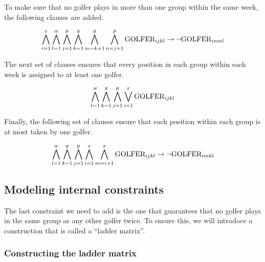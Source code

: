 \documentclass[a4paper]{scrartcl}
\begin{document}
To make sure that no golfer plays in more than one group within the same week, the following clauses are added:

\begin{equation}
\centering
    \bigwedge \limits_{i=1}^x 
    \bigwedge \limits_{l=1}^w 
    \bigwedge \limits_{j=1}^p
    \bigwedge \limits_{k=1}^g 
    \bigwedge \limits_{m=k+1}^g 
    \bigwedge \limits_{n=j+1}^p 
    \text{GOLFER}_{ijkl} 
    \to
    \neg \text{GOLFER}_{inml}
\end{equation}

The next set of clauses ensures that every position in each group within each week is assigned to at least one golfer.

\begin{equation}
\centering
    \bigwedge \limits_{l=1}^w 
    \bigwedge \limits_{k=1}^g 
    \bigwedge \limits_{j=1}^p
    \bigvee \limits_{i=1}^x 
    \text{GOLFER}_{ijkl}
\end{equation}


Finally, the following set of clauses ensure that each position within each group is at most taken by one golfer.

\begin{equation}
\centering
    \bigwedge \limits_{l=1}^w 
    \bigwedge \limits_{k=1}^g 
    \bigwedge \limits_{j=1}^p
    \bigwedge \limits_{i=1}^x 
    \bigwedge \limits_{m=i+1}^x 
    \text{GOLFER}_{ijkl} 
    \to
    \neg \text{GOLFER}_{imkl}
\end{equation}


\subsection{Modeling internal constraints}

The last constraint we need to add is the one that guarantees that no golfer plays in the same group as any other golfer twice. To ensure this, we will introdoce a construction that is called a ``ladder matrix''.


\subsubsection{Constructing the ladder matrix}
\end{document}
